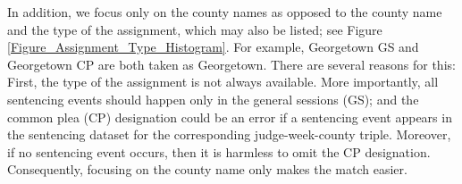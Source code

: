 \documentclass[11pt, oneside]{article}   	%
\theoremstyle{ModifiedStyle}
\begin{document}
  	In addition, we focus only on the county names as opposed to the county name and the type of the assignment, which may also be listed; see Figure \ref{Figure_Assignment_Type_Histogram}. For example, Georgetown GS and Georgetown CP are both taken as Georgetown. There are several reasons for this: First, the type of the assignment is not always available. More importantly, all sentencing events should happen only in the general sessions (GS); and the common plea (CP) designation could be an error if a sentencing event appears in the sentencing dataset for the corresponding judge-week-county triple. Moreover, if no sentencing event occurs, then it is harmless to omit the CP designation. Consequently, focusing on the county name only makes the match easier.

\end{document}
